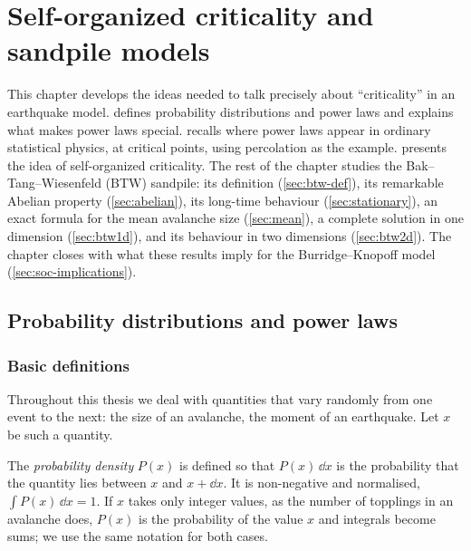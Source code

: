 \chapter{Self-organized criticality and sandpile models}
\label{ch:soc}



This chapter develops the ideas needed to talk precisely about ``criticality'' in an
earthquake model.  defines probability distributions and power laws and
explains what makes power laws special.  recalls where power laws
appear in ordinary statistical physics, at critical points, using percolation as the
example.  presents the idea of self-organized criticality. The rest of the
chapter studies the Bak--Tang--Wiesenfeld (BTW) sandpile: its definition
(\cref{sec:btw-def}), its remarkable Abelian property (\cref{sec:abelian}), its long-time
behaviour (\cref{sec:stationary}), an exact formula for the mean avalanche size
(\cref{sec:mean}), a complete solution in one dimension (\cref{sec:btw1d}), and its
behaviour in two dimensions (\cref{sec:btw2d}). The chapter closes with what these results
imply for the Burridge--Knopoff model (\cref{sec:soc-implications}).

\section{Probability distributions and power laws}
\label{sec:pl}

\subsection{Basic definitions}

Throughout this thesis we deal with quantities that vary randomly from one event to the next:
the size of an avalanche, the moment of an earthquake. Let $x$ be such a quantity.

\begin{definition}
The \emph{probability density} $P(x)$ is defined so that $P(x)\,\dd x$ is the probability that
the quantity lies between $x$ and $x+\dd x$. It is non-negative and normalised,
$\int P(x)\,\dd x = 1$. If $x$ takes only integer values, as the number of topplings in an
avalanche does, $P(x)$ is the probability of the value $x$ and integrals become sums; we use the
same notation for both cases.
\end{definition}

